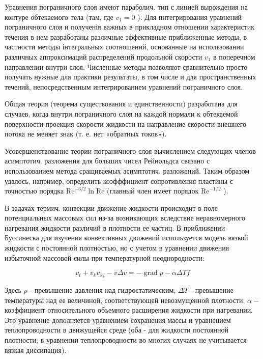 \documentclass[10pt]{article}
\begin{document}
Уравнения пограничного слоя имеют параболич. тип с линией вырождения на контуре обтекаемого тела (там, где $v_{1}=0$ ). Для пнтегрирования уравнений пограничного слоя и полученія важных в прикладном отношении характеристик течения в нем разработаны различные эффективные приближенные методы, в частности методы інтегральных соотношений, основанные на использовании различных аппроксимаций распределений продольной скорости $v_{1}$ в поперечном направлении внутри слоя. Численные методы позволяют сравнительно просто получать нужные для практики результаты, в том числе и для пространственных течений, непосредственным интегрированием уравнений пограничного слоя.



Общая теория (теорема существования и единственности) разработана для случаев, когда внутри пограничного слоя на каждой нормали к обтекаемой поверхности проекция скорости жидкости на направление скорости внешнего потока не меняет знак (т. е. нет «обратных токов»).



Усовершенствование теории пограничного слоя вычислением следующих членов асимптотич. разложения для больших чисел Рейнольдса связано с использованием метода сращиваемых асимптотич. разложений. Таким образом удалось, например, определить коэфффициент сопротивления пластины с точностью порядка $\mathrm{Re}^{-3 / 2} \ln \mathrm{Re}$ (главный член имеет порядок $\mathrm{Re}^{-1 / 2}$ ).



В задачах термич. конвекции движение жидкости происходит в поле потенциальных массовых сил из-за возникающих вследствие неравномерного нагревания жидкости различий в плотности ее частиц. В приближении Буссинеска для изучения конвективных движений используется модель вязкой жидкости с постоянной плотностью, но с учетом в уравнении движения избыточной массовой силы при температурной неоднородности:



\[

v_{t}+v_{k} v_{x_{k}}-v \Delta v=-\operatorname{grad} p-\alpha \Delta T f

\]



Здесь $p$ - превышение давления над гидростатическим, $\Delta T$ - превышение температуры над ее величиной, соответствующей невозмущенной плотности, $\alpha-$ коэффициент относительного объемного расширения жидкости при нагревании. Это уравнение дополняется уравнением сохранения массы и уравнением теплопроводности в движущейся среде (оба - для жидкости постоянной плотности; в уравнении теплопроводности во многих случаях не учитывается вязкая диссипация).
\end{document}
